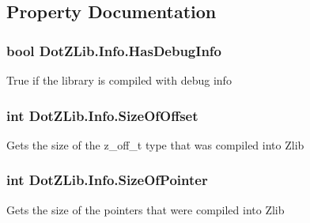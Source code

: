 \subsection{Property Documentation}
\hypertarget{class_dot_z_lib_1_1_info_aa35f5491fb48ddc389bd75d73993c017}{
\subsubsection[{Has\+Debug\+Info}]{\setlength{\rightskip}{0pt plus 5cm}bool Dot\+Z\+Lib.\+Info.\+Has\+Debug\+Info\hspace{0.3cm}{\ttfamily [get]}}}\label{class_dot_z_lib_1_1_info_aa35f5491fb48ddc389bd75d73993c017}


True if the library is compiled with debug info 

\hypertarget{class_dot_z_lib_1_1_info_a9348e39f58b7c42240cf19d836ab3991}{
\subsubsection[{Size\+Of\+Offset}]{\setlength{\rightskip}{0pt plus 5cm}int Dot\+Z\+Lib.\+Info.\+Size\+Of\+Offset\hspace{0.3cm}{\ttfamily [get]}}}\label{class_dot_z_lib_1_1_info_a9348e39f58b7c42240cf19d836ab3991}


Gets the size of the z\+\_\+off\+\_\+t type that was compiled into Zlib 

\hypertarget{class_dot_z_lib_1_1_info_ae661fa84df8c5d876c2baa8e7343816e}{
\subsubsection[{Size\+Of\+Pointer}]{\setlength{\rightskip}{0pt plus 5cm}int Dot\+Z\+Lib.\+Info.\+Size\+Of\+Pointer\hspace{0.3cm}{\ttfamily [get]}}}\label{class_dot_z_lib_1_1_info_ae661fa84df8c5d876c2baa8e7343816e}


Gets the size of the pointers that were compiled into Zlib 


